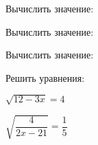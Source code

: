 \begin{listofex}
	\item Вычислить значение:
	\begin{enumcols}[itemcolumns=3]
		\item {}
		\item {}
		\item {}
		\item {}
		\item {}
	\end{enumcols}
	\item Вычислить значение:
	\begin{enumcols}[itemcolumns=2]
		\item {}
		\item {}
		\item {}
		\item {}
		\item {}
	\end{enumcols}
	\item Вычислить значение:
	\begin{enumcols}[itemcolumns=2]
		\item {}
		\item {}
		\item {}
	\end{enumcols}
	\item {}
	\item Решить уравнения:
	\begin{enumcols}[itemcolumns=2]
		\item {}
		\item \( \sqrt{12-3x}=4 \)
		\item \( \sqrt{\dfrac{4}{2x-21}}=\dfrac{1}{5} \)
		\item {}
	\end{enumcols}
\end{listofex}